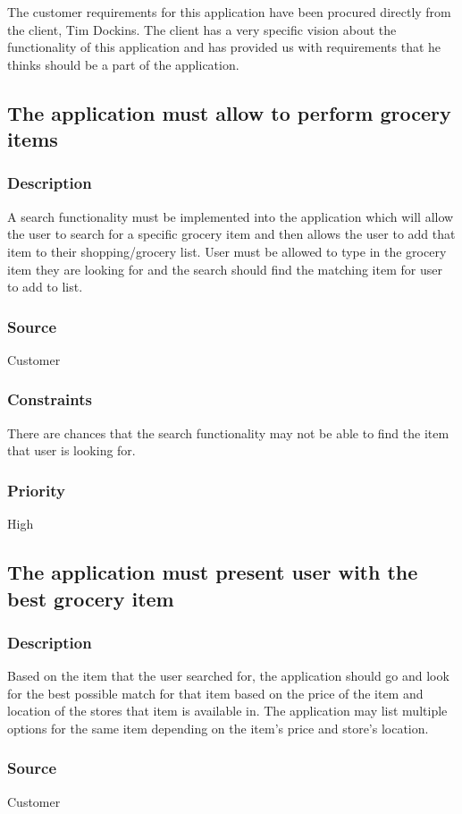 The customer requirements for this application have been procured directly from the client, Tim Dockins. The client has a very specific vision about the functionality of this application and has provided us with requirements that he thinks should be a part of the application.
\subsection{The application must allow to perform grocery items}
\subsubsection{Description}
A search functionality must be implemented into the application which will allow the user to search for a specific grocery item and then allows the user to add that item to their shopping/grocery list. User must be allowed to type in the grocery item they are looking for and the search should find the matching item for user to add to list.
\subsubsection{Source}
Customer
\subsubsection{Constraints}
There are chances that the search functionality may not be able to find the item that user is looking for.
\subsubsection{Priority}
High
\\
\subsection{The application must present user with the best grocery item}
\subsubsection{Description}
Based on the item that the user searched for, the application should go and look for the best possible match for that item based on the price of the item and location of the stores that item is available in. The application may list multiple options for the same item depending on the item's price and store's location.
\subsubsection{Source}
Customer
